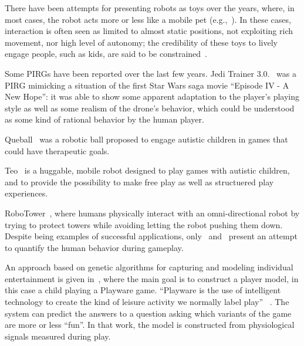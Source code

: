 There have been attempts for presenting robots as toys over the years, where, in most cases, the robot acts more or less like a mobile pet (e.g.,~\cite{fujita_open_1997, brooks_robots_2004}). In these cases, interaction is often seen as limited to almost static positions, not exploiting rich movement, nor high level of autonomy; the credibility of these toys to lively engage people, such as kids, are said to be constrained~\cite{martinoia_physically_2013, bonarini_timing_2014}. 

Some PIRGs have been reported over the last few years. Jedi Trainer 3.0.~\cite{martinoia_physically_2013} was a PIRG mimicking a situation of the first Star Wars saga movie ``Episode IV - A New Hope'': it was able to show some apparent adaptation to the player's playing style as well as some realism of the drone's behavior, which could be understood as some kind of rational behavior by the human player.

Queball~\cite{salter_designing_2014} was a robotic ball proposed to engage autistic children in games that could have therapeutic goals.

Teo~\cite{bonarini_huggable_2016} is a huggable, mobile robot designed to play games with autistic children, and to provide the possibility to make free play as well as structuered play experiences.

RoboTower~\cite{oliveira_learning_2018, oliveira_activity_2017, oliveira_modeling_2017}, where humans physically interact with an omni-directional robot by trying to protect towers while avoiding letting the robot pushing them down.
Despite being examples of successful applications, only~\cite{oliveira_modeling_2017} and~\cite{oliveira_learning_2018} present an attempt to quantify the human behavior during gameplay.%

An approach based on genetic algorithms for capturing and modeling individual entertainment is given in~\cite{yannakakis_entertainment_2008}, where the main goal is to construct a player model, in this case a child playing a Playware game. ``Playware is the use of intelligent technology to create the kind of leisure activity we normally label play''%
~\cite{lund_playware_2005}. The system can predict the answers to a question asking which variants of the game are more or less ``fun''. In that work, the model is constructed from physiological signals measured during play. 

